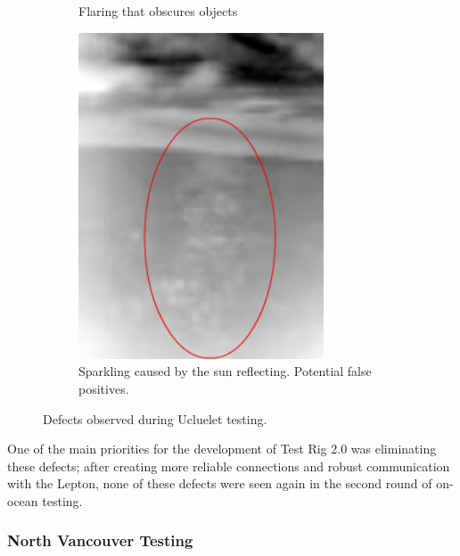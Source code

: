 \begin{figure}
\begin{subfigure}{0.3\textwidth}
 \caption{Flaring that obscures objects}
 \label{fig:defects:sub2}
\end{subfigure}
\begin{subfigure}{0.3\textwidth}
 \centering
 \includegraphics[width=0.8\textwidth]{"./image/sparkles_circled"}
 \caption{Sparkling caused by the sun reflecting. Potential false positives.}
 \label{fig:defects:sub3}
\end{subfigure}
\caption{Defects observed during Ucluelet testing.}
\label{fig:defects}
\end{figure}

One of the main priorities for the development of Test Rig 2.0 was eliminating these defects; after creating more reliable connections and robust communication with the Lepton, none of these defects were seen again in the second round of on-ocean testing.


\subsubsection{\label{sec:discussion:results:testrig2}North Vancouver Testing}

